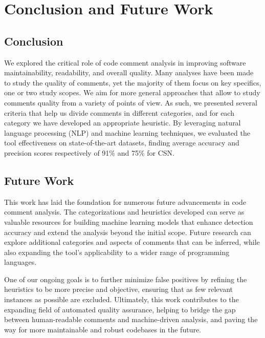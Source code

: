 
\chapter{Conclusion and Future Work} %

\label{Chapter5}


\section{Conclusion}
We explored the critical role of code comment analysis in improving software maintainability, readability, and overall quality. Many analyses have been made to study the quality of comments, yet the majority of them focus on key specifics, one or two study scopes. We aim for more general approaches that allow to study comments quality from a variety of points of view. As such, we presented several criteria that help us divide comments in different categories, and for each category we have developed an appropriate heuristic. By leveraging natural language processing (NLP) and machine learning techniques, we evaluated the tool effectiveness on state-of-the-art datasets, finding average accuracy and precision scores respectively of 91\% and 75\% for CSN.

\section{Future Work}
This work has laid the foundation for numerous future advancements in code comment analysis. The categorizations and heuristics developed can serve as valuable resources for building machine learning models that enhance detection accuracy and extend the analysis beyond the initial scope. Future research can explore additional categories and aspects of comments that can be inferred, while also expanding the tool's applicability to a wider range of programming languages.

\noindent One of our ongoing goals is to further minimize false positives by refining the heuristics to be more precise and objective, ensuring that as few relevant instances as possible are excluded. Ultimately, this work contributes to the expanding field of automated quality assurance, helping to bridge the gap between human-readable comments and machine-driven analysis, and paving the way for more maintainable and robust codebases in the future.